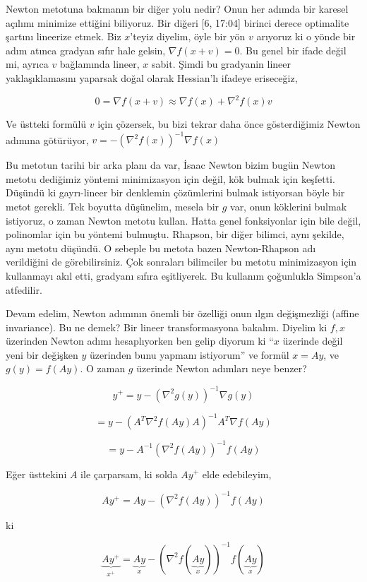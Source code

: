 \documentclass[12pt,fleqn]{article}\usepackage{../../common}
\begin{document}
Newton metotuna bakmanın bir diğer yolu nedir? Onun her adımda bir karesel
açılımı minimize ettiğini biliyoruz. Bir diğeri [6, 17:04] birinci derece
optimalite şartını lineerize etmek. Biz $x$'teyiz diyelim, öyle bir yön $v$
arıyoruz ki o yönde bir adım atınca gradyan sıfır hale gelsin, 
$\nabla f(x+v)=0$. Bu genel bir ifade değil mi, ayrıca $v$ bağlamında
lineer, $x$ sabit. Şimdi bu gradyanin lineer yaklaşıklamasını yaparsak
doğal olarak Hessian'lı ifadeye eriseceğiz, 

$$
0 = \nabla f(x+v) \approx \nabla f(x) + \nabla^2 f(x) v
$$

Ve üstteki formülü $v$ için çözersek, bu bizi tekrar daha önce
gösterdiğimiz Newton adımına götürüyor, 
$v = - \left( \nabla^2 f(x) \right)^{-1} \nabla f(x)$

Bu metotun tarihi bir arka planı da var, İsaac Newton bizim bugün Newton
metotu dediğimiz yöntemi minimizasyon için değil, kök bulmak için
keşfetti. Düşündü ki gayrı-lineer bir denklemin çözümlerini bulmak
istiyorsan böyle bir metot gerekli. Tek boyutta düşünelim, mesela bir $g$
var, onun köklerini bulmak istiyoruz, o zaman Newton metotu kullan. Hatta
genel fonksiyonlar için bile değil, polinomlar için bu yöntemi
bulmuştu. Rhapson, bir diğer bilimci, aynı şekilde, aynı metotu düşündü. O
sebeple bu metota bazen Newton-Rhapson adı verildiğini de görebilirsiniz.
Çok sonraları bilimciler bu metotu minimizasyon için kullanmayı akıl etti,
gradyanı sıfıra eşitliyerek. Bu kullanım çoğunlukla Simpson'a atfedilir.

Devam edelim, Newton adımının önemli bir özelliği onun ılgın değişmezliği
(affine invariance). Bu ne demek? Bir lineer transformasyona
bakalım. Diyelim ki $f,x$ üzerinden Newton adımı hesaplıyorken ben gelip
diyorum ki ``$x$ üzerinde değil yeni bir değişken $y$ üzerinden bunu
yapmanı istiyorum'' ve formül $x = Ay$, ve $g(y) = f(Ay)$. O zaman $g$
üzerinde Newton adımları neye benzer? 

$$
y^+ = y - (\nabla^2 g(y))^{-1} \nabla g(y)
$$

$$
= y - (A^T \nabla^2 f(Ay) A)^{-1} A^T \nabla f(Ay)
$$

$$
= y - A^{-1} (\nabla^2 f(Ay))^{-1} f(Ay)
$$

Eğer üsttekini $A$ ile çarparsam, ki solda $Ay^+$ elde edebileyim, 


$$
Ay^+ = Ay -  (\nabla^2 f(Ay))^{-1} f(Ay)
$$

ki

$$
\underbrace{Ay^+}_{x^+} =
\underbrace{Ay}_{x} -  
(\nabla^2 f(\underbrace{Ay}_{x}))^{-1} f(\underbrace{Ay}_{x})
$$
\end{document}
